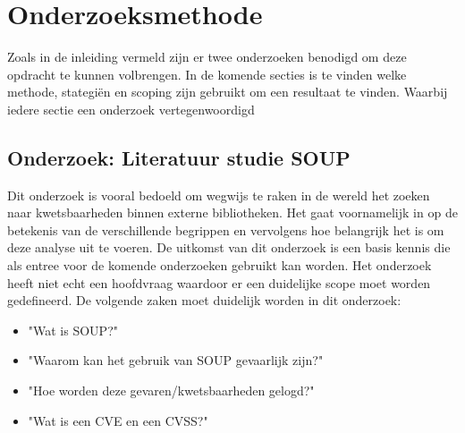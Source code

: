 

\chapter{Onderzoeksmethode}\label{ch:onderzoeksmethode} %

Zoals in de inleiding vermeld zijn er twee onderzoeken benodigd om deze opdracht te kunnen volbrengen.
In de komende secties is te vinden welke methode, stategiën en scoping zijn gebruikt om een resultaat te vinden.
Waarbij iedere sectie een onderzoek vertegenwoordigd


\section{Onderzoek: Literatuur studie SOUP}\label{sec:onderzoek:-literatuur-studie-soup}
Dit onderzoek is vooral bedoeld om wegwijs te raken in de wereld het zoeken naar kwetsbaarheden binnen externe bibliotheken.
Het gaat voornamelijk in op de betekenis van de verschillende begrippen en vervolgens hoe belangrijk het is om deze analyse uit te voeren.
De uitkomst van dit onderzoek is een basis kennis die als entree voor de komende onderzoeken gebruikt kan worden.
Het onderzoek heeft niet echt een hoofdvraag waardoor er een duidelijke scope moet worden gedefineerd.
De volgende zaken moet duidelijk worden in dit onderzoek:
\begin{itemize}
  \item "Wat is SOUP?"
  \item "Waarom kan het gebruik van SOUP gevaarlijk zijn?"
  \item "Hoe worden deze gevaren/kwetsbaarheden gelogd?"
  \item "Wat is een CVE en een CVSS?"
\end{itemize}


